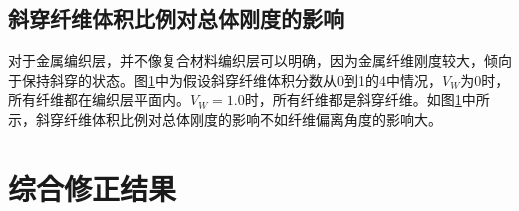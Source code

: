 \subsection{斜穿纤维体积比例对总体刚度的影响}

对于金属编织层，并不像复合材料编织层可以明确，因为金属纤维刚度较大，倾向于保持斜穿的状态。图\ref{fig:Vw-MOD}中为假设斜穿纤维体积分数从0到1的4中情况，$ V_W $为$ 0 $时，所有纤维都在编织层平面内。$ V_W=1.0  $时，所有纤维都是斜穿纤维。如图\ref{fig:Vw-MOD}中所示，斜穿纤维体积比例对总体刚度的影响不如纤维偏离角度的影响大。


\begin{figure}[!htp]
\centering
{}
\label{fig:Vw-MOD}
\end{figure}






\section{综合修正结果}

